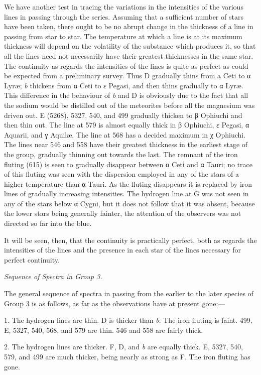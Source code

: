\documentclass[a4paper, 12pt, oneside, polutonikogreek, english]{article}
\begin{document}
We have another test in tracing the variations in the intensities of the various lines in passing through the series. Assuming that a sufficient number of stars have been taken, there ought to be no abrupt change in the thickness of a line in passing from star to star. The temperature at which a line is at its maximum thickness will depend on the volatility of the substance which produces it, so that all the lines need not necessarily have their greatest thicknesses in the same star. The continuity as regards the intensities of the lines is quite as perfect as could be expected from a preliminary survey. Thus D gradually thins from a Ceti to α Lyræ; \emph{b} thickens from α Ceti to ε Pegasi, and then thins gradually to α Lyræ. This difference in the behaviour of \emph{b} and D is obviously due to the fact that all the sodium would be distilled out of the meteorites before all the magnesium was driven out. E (5268), 5327, 540, and 499 gradually thicken to β Ophiuchi and then thin out. The line at 579 is almost equally thick in β Ophiuchi, ε Pegasi, α Aquarii, and γ Aquilæ. The line at 568 has a decided maximum in χ Ophiuchi. The lines near 546 and 558 have their greatest thickness in the earliest stage of the group, gradually thinning out towards the last. The remnant of the iron fluting (615) is seen to gradually disappear between α Ceti and α Tauri; no trace of this fluting was seen with the dispersion employed in any of the stars of a higher temperature than α Tauri. As the fluting disappears it is replaced by iron lines of gradually increasing intensities. The hydrogen line at G was not seen in any of the stars below α Cygni, but it does not follow that it was absent, because the lower stars being generally fainter, the attention of the observers was not directed so far into the blue.

It will be seen, then, that the continuity is practically perfect, both as regards the intensities of the lines and the presence in each star of the lines necessary for perfect continuity.

\emph{Sequence of Spectra in Group 3.}

The general sequence of spectra in passing from the earlier to the later species of Group 3 is as follows, as far as the observations have at present gone:---

1. The hydrogen lines are thin. D is thicker than \emph{b}. The iron fluting is faint. 499, E, 5327, 540, 568, and 579 are thin. 546 and 558 are fairly thick.

2. The hydrogen lines are thicker. F, D, and \emph{b} are equally thick. E, 5327, 540, 579, and 499 are much thicker, being nearly as strong as F. The iron fluting has gone.
\end{document}
